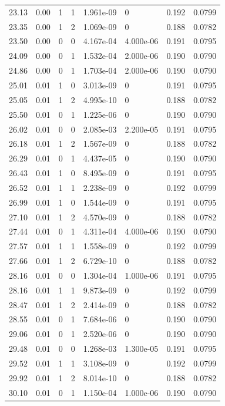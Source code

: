\documentclass[preview]{standalone}
\begin{document}
{{{\begin{tabular}{L{1.2cm}C{1.2cm} C{0.3cm}C{0.5cm} C{1.4cm}C{1.4cm} C{1.4cm}C{1.4cm}}
  23.13  &  0.00  & 1     &  1 &  1.961e-09  & 0  & 0.192 &  0.0799   \\ 
  23.35  &  0.00  & 1     &  2 &  1.069e-09  & 0  & 0.188 &  0.0782   \\ 
  23.50  &  0.00  & 0     &  0 &  4.167e-04  & 4.000e-06  & 0.191 &  0.0795   \\ 
  24.09  &  0.00  & 0     &  1 &  1.532e-04  & 2.000e-06  & 0.190 &  0.0790   \\ 
  24.86  &  0.00  & 0     &  1 &  1.703e-04  & 2.000e-06  & 0.190 &  0.0790   \\ 
  25.01  &  0.01  & 1     &  0 &  3.013e-09  & 0  & 0.191 &  0.0795   \\ 
  25.05  &  0.01  & 1     &  2 &  4.995e-10  & 0  & 0.188 &  0.0782   \\ 
  25.50  &  0.01  & 0     &  1 &  1.225e-06  & 0  & 0.190 &  0.0790   \\ 
  26.02  &  0.01  & 0     &  0 &  2.085e-03  & 2.200e-05  & 0.191 &  0.0795   \\ 
  26.18  &  0.01  & 1     &  2 &  1.567e-09  & 0  & 0.188 &  0.0782   \\ 
  26.29  &  0.01  & 0     &  1 &  4.437e-05  & 0  & 0.190 &  0.0790   \\ 
  26.43  &  0.01  & 1     &  0 &  8.495e-09  & 0  & 0.191 &  0.0795   \\ 
  26.52  &  0.01  & 1     &  1 &  2.238e-09  & 0  & 0.192 &  0.0799   \\ 
  26.99  &  0.01  & 1     &  0 &  1.544e-09  & 0  & 0.191 &  0.0795   \\ 
  27.10  &  0.01  & 1     &  2 &  4.570e-09  & 0  & 0.188 &  0.0782   \\ 
  27.44  &  0.01  & 0     &  1 &  4.311e-04  & 4.000e-06  & 0.190 &  0.0790   \\ 
  27.57  &  0.01  & 1     &  1 &  1.558e-09  & 0  & 0.192 &  0.0799   \\ 
  27.66  &  0.01  & 1     &  2 &  6.729e-10  & 0  & 0.188 &  0.0782   \\ 
  28.16  &  0.01  & 0     &  0 &  1.304e-04  & 1.000e-06  & 0.191 &  0.0795   \\ 
  28.16  &  0.01  & 1     &  1 &  9.873e-09  & 0  & 0.192 &  0.0799   \\ 
  28.47  &  0.01  & 1     &  2 &  2.414e-09  & 0  & 0.188 &  0.0782   \\ 
  28.55  &  0.01  & 0     &  1 &  7.684e-06  & 0  & 0.190 &  0.0790   \\ 
  29.06  &  0.01  & 0     &  1 &  2.520e-06  & 0  & 0.190 &  0.0790   \\ 
  29.48  &  0.01  & 0     &  0 &  1.268e-03  & 1.300e-05  & 0.191 &  0.0795   \\ 
  29.52  &  0.01  & 1     &  1 &  3.108e-09  & 0  & 0.192 &  0.0799   \\ 
  29.92  &  0.01  & 1     &  2 &  8.014e-10  & 0  & 0.188 &  0.0782   \\ 
  30.10  &  0.01  & 0     &  1 &  1.150e-04  & 1.000e-06  & 0.190 &  0.0790   \\ 
\hline 
\end{tabular} 

}}}
\end{document}
